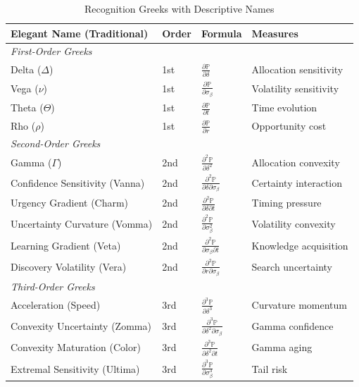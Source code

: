 \begin{table}[h]
\centering
\small
\begin{tabular}{llll}
\toprule
\textbf{Elegant Name (Traditional)} & \textbf{Order} & \textbf{Formula} & \textbf{Measures} \\
\midrule
\multicolumn{4}{l}{\textit{First-Order Greeks}} \\
Delta ($\Delta$) & 1st & $\frac{\partial \mathbb{P}}{\partial \delta}$ & Allocation sensitivity \\
Vega ($\nu$) & 1st & $\frac{\partial \mathbb{P}}{\partial \sigma_\beta}$ & Volatility sensitivity \\
Theta ($\Theta$) & 1st & $\frac{\partial \mathbb{P}}{\partial t}$ & Time evolution \\
Rho ($\rho$) & 1st & $\frac{\partial \mathbb{P}}{\partial r}$ & Opportunity cost \\
\midrule
\multicolumn{4}{l}{\textit{Second-Order Greeks}} \\
Gamma ($\Gamma$) & 2nd & $\frac{\partial^2 \mathbb{P}}{\partial \delta^2}$ & Allocation convexity \\
Confidence Sensitivity (Vanna) & 2nd & $\frac{\partial^2 \mathbb{P}}{\partial \delta \partial \sigma_\beta}$ & Certainty interaction \\
Urgency Gradient (Charm) & 2nd & $\frac{\partial^2 \mathbb{P}}{\partial \delta \partial t}$ & Timing pressure \\
Uncertainty Curvature (Vomma) & 2nd & $\frac{\partial^2 \mathbb{P}}{\partial \sigma_\beta^2}$ & Volatility convexity \\
Learning Gradient (Veta) & 2nd & $\frac{\partial^2 \mathbb{P}}{\partial \sigma_\beta \partial t}$ & Knowledge acquisition \\
Discovery Volatility (Vera) & 2nd & $\frac{\partial^2 \mathbb{P}}{\partial r \partial \sigma_\beta}$ & Search uncertainty \\
\midrule
\multicolumn{4}{l}{\textit{Third-Order Greeks}} \\
Acceleration (Speed) & 3rd & $\frac{\partial^3 \mathbb{P}}{\partial \delta^3}$ & Curvature momentum \\
Convexity Uncertainty (Zomma) & 3rd & $\frac{\partial^3 \mathbb{P}}{\partial \delta^2 \partial \sigma_\beta}$ & Gamma confidence \\
Convexity Maturation (Color) & 3rd & $\frac{\partial^3 \mathbb{P}}{\partial \delta^2 \partial t}$ & Gamma aging \\
Extremal Sensitivity (Ultima) & 3rd & $\frac{\partial^3 \mathbb{P}}{\partial \sigma_\beta^3}$ & Tail risk \\
\bottomrule
\end{tabular}
\caption{Recognition Greeks with Descriptive Names}
\end{table}

